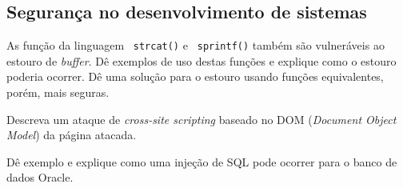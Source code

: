 \subsection{Segurança no desenvolvimento de sistemas}

\exercise As função da linguagem \CEE\ {\tt strcat()} e {\tt
  sprintf()} também são vulneráveis ao estouro de {\em buffer}. Dê
exemplos de uso destas funções e explique como o estouro poderia
ocorrer. Dê uma solução para o estouro usando funções equivalentes,
porém, mais seguras.\par

\exercise Descreva um ataque de {\em cross-site scripting} baseado no
DOM ({\em Document Object Model}) da página atacada.\par

\exercise Dê exemplo e explique como uma injeção de SQL pode ocorrer
para o banco de dados Oracle.\par